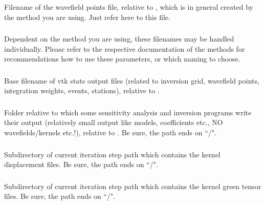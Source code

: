 \subsubsection{} 
Filename of the wavefield points file, relative to , which
is in general created by the method you are using. Just refer here to this file. 
\subsubsection{} \label{files,sec:iter_parfile,itm:model}
Dependent on the method you are using, these filenames may be handled individually. Please refer to the respective 
documentation of the methods for recommendations how to use these parameters, or which naming to choose.
\subsubsection{}
Base filename of vtk stats output files (related to inversion grid, wavefield points, integration weights,
events, stations), relative to . 
\subsubsection{}
Folder relative to which some sensitivity analysis and inversion programs write their output (relatively small output
like models, coefficients etc., NO wavefields/kernels etc.!), relative to 
.  Be sure, the path ends on ``/".
\subsubsection{} 
Subdirectory of current iteration step path
 which contains the 
kernel displacement files. Be sure, the path ends on ``/".
\subsubsection{} 
Subdirectory of current iteration step path
 which contains the 
kernel green tensor files. Be sure, the path ends on ``/".

